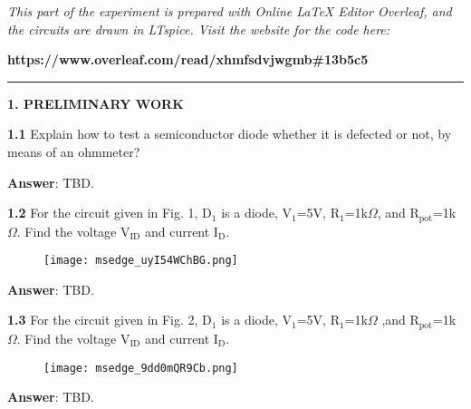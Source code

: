 \documentclass{article}
\begin{document}
\large

{\textit{This part of the experiment is prepared with Online LaTeX Editor Overleaf, and the circuits are drawn in LTspice. Visit the website for the code here:}}

{\textbf{https://www.overleaf.com/read/xhmfsdvjwgmb\#13b5c5}}
\vspace{4mm}
\hrule
\vspace{4mm}
{\Large \textbf{1. PRELIMINARY WORK}}

\vspace{4mm} 

{\textbf{1.1} Explain how to test a semiconductor diode whether it is defected or not, by means of 
an ohmmeter?}

\vspace{4mm}

{\textbf{Answer}: TBD.}

\vspace{8mm}

{\textbf{1.2} For the circuit given in Fig. 1, D$_1$ is a diode, V$_1$=5V, R$_1$=1k$\Omega$, and R$_{\text{pot}}$=1k$\Omega$. Find the voltage V$_{\text{ID}}$ and current I$_{\text{D}}$.}

\begin{figure}[H]
    \centering
    \texttt{[image: msedge\_uyI54WChBG.png]}
\end{figure}

\vspace{4mm}

{\textbf{Answer}: TBD.}

\vspace{8mm}

{\textbf{1.3} For the circuit given in Fig. 2, D$_1$ is a diode, V$_1$=5V, R$_1$=1k$\Omega$ ,and R$_{\text{pot}}$=1k$\Omega$. Find the voltage V$_{\text{ID}}$ and current I$_{\text{D}}$.}

\begin{figure}[H]
    \centering
    \texttt{[image: msedge\_9dd0mQR9Cb.png]}
\end{figure}

\vspace{4mm}

{\textbf{Answer}: TBD.}


\end{document}
